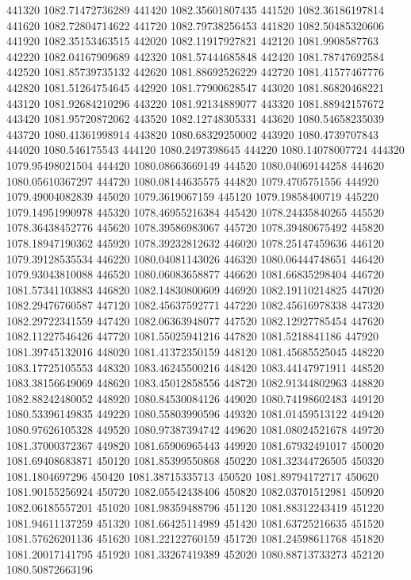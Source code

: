 {441320 1082.71472736289
441420 1082.35601807435
441520 1082.36186197814
441620 1082.72804714622
441720 1082.79738256453
441820 1082.50485320606
441920 1082.35153463515
442020 1082.11917927821
442120 1081.9908587763
442220 1082.04167909689
442320 1081.57444685848
442420 1081.78747692584
442520 1081.85739735132
442620 1081.88692526229
442720 1081.41577467776
442820 1081.51264754645
442920 1081.77900628547
443020 1081.86820468221
443120 1081.92684210296
443220 1081.92134889077
443320 1081.88942157672
443420 1081.95720872062
443520 1082.12748305331
443620 1080.54658235039
443720 1080.41361998914
443820 1080.68329250002
443920 1080.4739707843
444020 1080.546175543
444120 1080.2497398645
444220 1080.14078007724
444320 1079.95498021504
444420 1080.08663669149
444520 1080.04069144258
444620 1080.05610367297
444720 1080.08144635575
444820 1079.4705751556
444920 1079.49004082839
445020 1079.3619067159
445120 1079.19858400719
445220 1079.14951990978
445320 1078.46955216384
445420 1078.24435840265
445520 1078.36438452776
445620 1078.39586983067
445720 1078.39480675492
445820 1078.18947190362
445920 1078.39232812632
446020 1078.25147459636
446120 1079.39128535534
446220 1080.04081143026
446320 1080.06444748651
446420 1079.93043810088
446520 1080.06083658877
446620 1081.66835298404
446720 1081.57341103883
446820 1082.14830800609
446920 1082.19110214825
447020 1082.29476760587
447120 1082.45637592771
447220 1082.45616978338
447320 1082.29722341559
447420 1082.06363948077
447520 1082.12927785454
447620 1082.11227546426
447720 1081.55025941216
447820 1081.5218841186
447920 1081.39745132016
448020 1081.41372350159
448120 1081.45685525045
448220 1083.17725105553
448320 1083.46245500216
448420 1083.44147971911
448520 1083.38156649069
448620 1083.45012858556
448720 1082.91344802963
448820 1082.88242480052
448920 1080.84530084126
449020 1080.74198602483
449120 1080.53396149835
449220 1080.55803990596
449320 1081.01459513122
449420 1080.97626105328
449520 1080.97387394742
449620 1081.08024521678
449720 1081.37000372367
449820 1081.65906965443
449920 1081.67932491017
450020 1081.69408683871
450120 1081.85399550868
450220 1081.32344726505
450320 1081.1804697296
450420 1081.38715335713
450520 1081.89794172717
450620 1081.90155256924
450720 1082.05542438406
450820 1082.03701512981
450920 1082.06185557201
451020 1081.98359488796
451120 1081.88312243419
451220 1081.94611137259
451320 1081.66425114989
451420 1081.63725216635
451520 1081.57626201136
451620 1081.22122760159
451720 1081.24598611768
451820 1081.20017141795
451920 1081.33267419389
452020 1080.88713733273
452120 1080.50872663196
}

